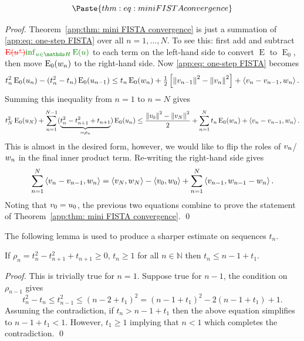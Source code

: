 \documentclass[smallextended]{svjour3}
\let\F\mathds\let\C\mathcal\newcommand{\R}{\F{R}}\newcommand{\A}{\tens{A}}
\newcommand{\norm}[1]{{\left\lVert #1 \right\rVert}}
\newcommand{\IP}[2]{\left\langle #1,#2 \right\rangle}
\newcommand{\op}[1]{\operatorname{#1}}
\newcommand{\1}{\F{1}}
\newcommand{\Emin}[1][\varf0]{\inf_{#1\in\F H}\op{E}(#1)}
\newcommand*{\varf}[1]{%
	\IfEqCase{#1}{%
		{0}{u}%
		{1}{v}%
		{2}{w}%
	}[u#1]%
}
\newcommand{\edit}[2]{{\ifmmode\text{\color{red}\sout{\ensuremath{#1}}}\else {\color{red} \sout{#1}}\fi} {\color{darkgreen} #2}}
\begin{document}
	
	
	\begin{theorem}\label{app:thm: mini FISTA convergence}
		\begin{equation}\label{app:eq: FISTA inequality}
			\Paste{thm:eq: mini FISTA convergence}
		\end{equation}
	\end{theorem}
	\begin{proof}
		Theorem~\ref{app:thm: mini FISTA convergence} is just a summation of \eqref{app:eq: one-step FISTA} over all $n=1,\ldots,N$. To see this: first add and subtract $\edit{\op{E}(\varf0^*)}{\Emin}$ to each term on the left-hand side to convert $\op{E}$ to $\op{E}_0$, then move $\op{E}_0(\varf2_n)$ to the right-hand side. Now \eqref{app:eq: one-step FISTA} becomes
		\begin{equation}
			t_n^2\op{E}_0(\varf0_n) - (t_n^2-t_n)\op{E}_0(\varf0_{n-1}) \leq t_n\op{E}_0(\varf2_n) + \tfrac1{2}\left[\norm{\varf1_{n-1}}^2-\norm{\varf1_n}^2\right] + \IP{\varf1_n-\varf1_{n-1}}{\varf2_n}. 
		\end{equation}
		Summing this inequality from $n=1$ to $n=N$ gives
		\begin{equation}
			t_N^2\op{E}_0(\varf0_N) + \sum_{n=1}^{N-1}(\underbrace{t_n^2-t_{n+1}^2+t_{n+1}}_{=\rho_n})\op{E}_0(\varf0_n) \leq \frac{\norm{\varf1_0}^2-\norm{\varf1_N}^2}{2} + \sum_{n=1}^N t_n\op{E}_0(\varf2_n)+\IP{\varf1_n-\varf1_{n-1}}{\varf2_n}.
		\end{equation}
		This is almost in the desired form, however, we would like to flip the roles of $\varf1_n$/$\varf2_n$ in the final inner product term. Re-writing the right-hand side gives
		\begin{equation}
			\sum_{n=1}^N\IP{\varf1_n-\varf1_{n-1}}{\varf2_n} = \IP{\varf1_N}{\varf2_N} - \IP{\varf1_0}{\varf2_0}+ \sum_{n=1}^N\IP{\varf1_{n-1}}{\varf2_{n-1}-\varf2_n}.
		\end{equation}
		Noting that $\varf1_0=\varf0_0$, the previous two equations combine to prove the statement of Theorem~\ref{app:thm: mini FISTA convergence}.
		\qed\end{proof}
	
	The following lemma is used to produce a sharper estimate on sequences $t_n$.
	\begin{lemma}\label{app: tn upper bound}
		If $\rho_n=t_{n}^2-t_{n+1}^2+t_{n+1}\geq0$, $t_n\geq 1$ for all $n\in\F N$ then $t_n\leq n-1 +t_1$.
	\end{lemma}
	\begin{proof}
		This is trivially true for $n=1$. Suppose true for $n-1$, the condition on $\rho_{n-1}$ gives
		\begin{equation}
			t_n^2 -t_n \leq t_{n-1}^2 \leq (n-2+t_1)^2 = (n-1+t_1)^2 -2(n-1+t_1) + 1.
		\end{equation}
		Assuming the contradiction, if $t_n> n-1+t_1$ then the above equation simplifies to $n-1+t_1 < 1$. However, $t_1\geq 1$ implying that $n<1$ which completes the contradiction.
		\qed\end{proof}
	
\end{document}

